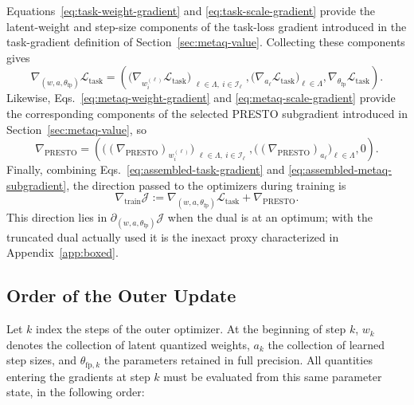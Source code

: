 \documentclass{article}
\begin{document}
Equations~\eqref{eq:task-weight-gradient} and
\eqref{eq:task-scale-gradient} provide the latent-weight and step-size
components of the task-loss gradient introduced in
the task-gradient definition of Section~\ref{sec:metaq-value}. Collecting these
components gives
\begin{equation}
  \nabla_{(w,a,\theta_{\mathrm{fp}})}\mathcal L_{\mathrm{task}}
  =
  \left(
    \bigl(\nabla_{w_i^{(\ell)}}\mathcal L_{\mathrm{task}}\bigr)_{
      \substack{\ell\in\Lambda,\ i\in\mathcal I_\ell}},
    \bigl(\nabla_{a_\ell}\mathcal L_{\mathrm{task}}\bigr)_{\ell\in\Lambda},
    \nabla_{\theta_{\mathrm{fp}}}\mathcal L_{\mathrm{task}}
  \right).
  \label{eq:assembled-task-gradient}
\end{equation}
Likewise, Eqs.~\eqref{eq:metaq-weight-gradient} and
\eqref{eq:metaq-scale-gradient} provide the corresponding components of the
selected PRESTO subgradient introduced in Section~\ref{sec:metaq-value}, so
\begin{equation}
  \nabla_{\mathrm{PRESTO}}
  =
  \left(
    \bigl((\nabla_{\mathrm{PRESTO}})_{w_i^{(\ell)}}\bigr)_{
      \substack{\ell\in\Lambda,\ i\in\mathcal I_\ell}},
    \bigl((\nabla_{\mathrm{PRESTO}})_{a_\ell}\bigr)_{\ell\in\Lambda},
    0
  \right).
  \label{eq:assembled-metaq-subgradient}
\end{equation}
Finally, combining Eqs.~\eqref{eq:assembled-task-gradient} and
\eqref{eq:assembled-metaq-subgradient}, the direction passed to the optimizers
during training is
\begin{equation}
  \nabla_{\mathrm{train}}\mathcal J
  :=
  \nabla_{(w,a,\theta_{\mathrm{fp}})}\mathcal L_{\mathrm{task}}
  +\nabla_{\mathrm{PRESTO}}.
  \label{eq:app-training-subgradient}
\end{equation}
This direction lies in
$\partial_{(w,a,\theta_{\mathrm{fp}})}\mathcal J$ when the dual is at an optimum;
with the truncated dual actually used it is the inexact proxy characterized in
Appendix~\ref{app:boxed}.


\subsection{Order of the Outer Update}

Let $k$ index the steps of the outer optimizer. At the beginning of step $k$,
$w_k$ denotes the collection of latent quantized weights, $a_k$ the collection
of learned step sizes, and $\theta_{\mathrm{fp},k}$ the parameters retained in
full precision. All quantities entering the gradients at step $k$ must be
evaluated from this same parameter state, in the following order:
\end{document}

